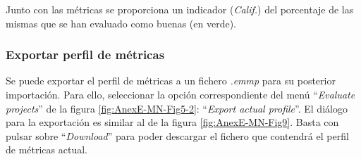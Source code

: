 Junto con las métricas se proporciona un indicador (\textit{Calif.}) del porcentaje de las mismas que se han evaluado como buenas (en verde).

\subsubsection{Exportar perfil de métricas}
Se puede exportar el perfil de métricas a un fichero \textit{.emmp} para su posterior importación. Para ello, seleccionar la opción correspondiente del menú ``\textit{Evaluate projects}'' de la figura \ref{fig:AnexE-MN-Fig5-2}: ``\textit{Export actual profile}''. El diálogo para la exportación es similar al de la figura \ref{fig:AnexE-MN-Fig9}. Basta con pulsar sobre ``\textit{Download}'' para poder descargar el fichero que contendrá el perfil de métricas actual.